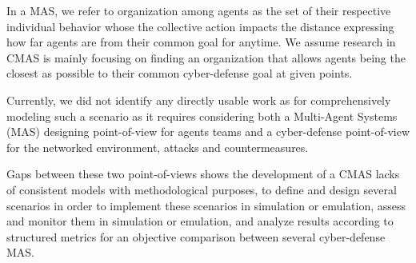 \documentclass[conference]{IEEEtran}
\begin{document}
In a MAS, we refer to organization among agents as the set of their respective individual behavior whose the collective action impacts the distance expressing how far agents are from their common goal for anytime. We assume research in CMAS is mainly focusing on finding an organization that allows agents being the closest as possible to their common cyber-defense goal at given points.


Currently, we did not identify any directly usable work as for comprehensively modeling such a scenario as it requires considering both a Multi-Agent Systems (MAS) designing point-of-view for agents teams and a cyber-defense point-of-view for the networked environment, attacks and countermeasures.



Gaps between these two point-of-views shows the development of a CMAS lacks of consistent models with methodological purposes, to define and design several scenarios in order to implement these scenarios in simulation or emulation, assess and monitor them in simulation or emulation, and analyze results according to structured metrics for an objective comparison between several cyber-defense MAS.
\end{document}
